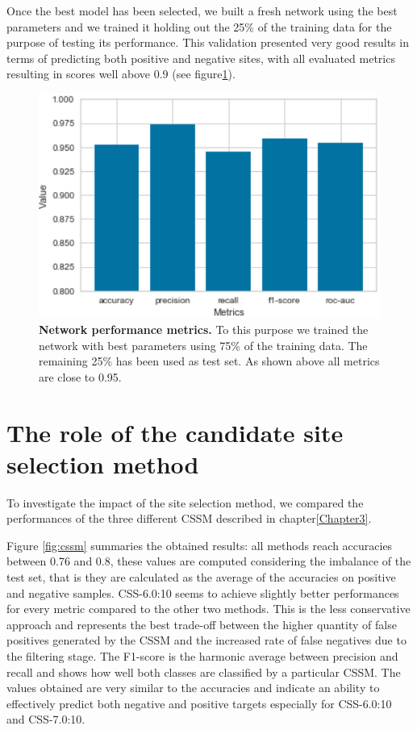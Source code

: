 Once the best model has been selected, we built a fresh network using the best parameters and we trained it holding out the 25\% of the training data for the purpose of testing its performance. This validation presented very good results in terms of predicting both positive and negative sites, with all evaluated metrics resulting in scores well above 0.9 (see figure\ref{fig:network_evaluation}).

\begin{figure}[hbt!]
	\centering
	\includegraphics[width=\textwidth]{Figures/network_evaluation}
	\caption{\textbf{Network performance metrics.} To this purpose we trained the network with best parameters using 75\% of the training data. The remaining 25\% has been used as test set. As shown above all metrics are close to 0.95.}
	\label{fig:network_evaluation}
\end{figure}

\section{The role of the candidate site selection method}
To investigate the impact of the site selection method, we compared the performances of the three different CSSM described in chapter\ref{Chapter3}. 

Figure \ref{fig:cssm} summaries the obtained results: all methods reach accuracies between 0.76 and 0.8, these values are computed considering the imbalance of the test set, that is they are calculated as the average of the accuracies on positive and negative samples. CSS-6.0:10 seems to achieve slightly better performances for every metric compared to the other two methods. This is the less conservative approach and represents the best trade-off between the higher quantity of false positives generated by the CSSM and the increased rate of false negatives due to the filtering stage. The F1-score is the harmonic average between precision and recall and shows how well both classes are classified by a particular CSSM. The values obtained are very similar to the accuracies and indicate an ability to effectively predict both negative and positive targets especially for CSS-6.0:10 and CSS-7.0:10.

